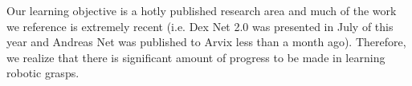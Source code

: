 Our learning objective is a hotly published research area and much of the work we reference is extremely recent (i.e. Dex Net 2.0 was presented in July of this year and Andreas Net was published to Arvix less than a month ago). 
Therefore, we realize that there is significant amount of progress to be made in learning robotic grasps. 